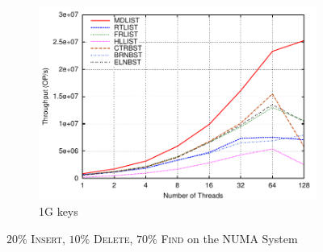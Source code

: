 \documentclass[10pt,conference,compsocconf]{IEEEtran}
\begin{document}
\begin{figure}[t]
\begin{subfigure}{0.32\textwidth}
        \includegraphics[width=1\columnwidth]{./data/amd20ins1Bkey}
      \caption{1G keys}
        \label{fig:1b20ins}
    \end{subfigure}
    \vspace{-0.08in}
 \caption{$20\%$ \textsc{Insert}, $10\%$ \textsc{Delete}, $70\%$ \textsc{Find} on the NUMA System}
    \label{fig:mixload}
\end{figure}
\end{document}
